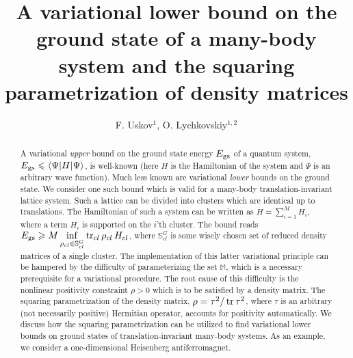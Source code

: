 \documentclass[a4paper]{jpconf}
\renewcommand\[{\begin{equation}}
\renewcommand\]{\end{equation}}
\begin{document}
\title{A variational lower bound on the ground state of a many-body system and the squaring parametrization of density matrices}

\author{F. Uskov$^1$,  O. Lychkovskiy$^{1,2}$}

\address{$^1$ Skolkovo Institute of Science and Technology,	Nobel street 3, Moscow  121205, Russia}
\address{$^2$ Steklov Mathematical Institute of Russian Academy of Sciences,	Gubkina str., 8, Moscow 119991, Russia}


\begin{abstract}
A variational {\it upper} bound on the ground state energy $E_{\rm gs}$ of a quantum system, $E_{\rm gs} \leqslant \langle \Psi|H| \Psi \rangle$, is well-known (here $H$ is the Hamiltonian of the system and $\Psi$ is an arbitrary wave function). Much less known are variational {\it lower} bounds on the ground state. We consider one such bound which is valid for a many-body translation-invariant lattice system. Such a lattice can be divided into clusters which are identical up to translations. The Hamiltonian of such a system can be written as $H=\sum_{i=1}^M H_i$, where a term $H_i$ is supported on the $i$'th cluster. The bound reads $E_{\rm gs}\geqslant M \inf\limits_{\rho_{cl} \in {\mathbb S_{cl}^G}} \mathop{\mathrm{tr}}\nolimits_{cl}\rho_{cl} \, H_{cl} $, where ${\mathbb S_{cl}^G}$ is some wisely chosen set of reduced density matrices of a single cluster. The implementation of this latter variational principle can be hampered by the difficulty of parameterizing the set  $\mathbb M$, which is a necessary prerequisite for a variational procedure. The root cause of this difficulty is the nonlinear positivity constraint $\rho>0$ which is to be satisfied by a density matrix. The squaring parametrization of the density matrix, $\rho=\tau^2/\mathop{\mathrm{tr}}\nolimits\tau^2$, where $\tau$ is an arbitrary (not necessarily positive) Hermitian operator, accounts for positivity automatically. We discuss how the squaring parametrization can be utilized to find variational lower bounds on ground states of translation-invariant many-body systems. As an example, we consider a one-dimensional Heisenberg antiferromagnet.
\end{abstract}
\end{document}
